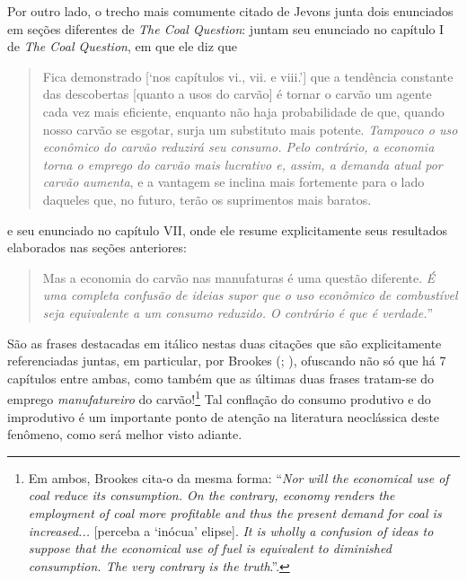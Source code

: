 Por outro lado, o trecho mais comumente citado de Jevons junta dois enunciados em seções diferentes de \textit{The Coal Question}: juntam seu enunciado no capítulo I de \textit{The Coal Question}, em que ele diz que
\begin{quote}
    Fica demonstrado [`nos capítulos vi., vii. e viii.'] que a tendência constante das descobertas [quanto a usos do carvão] é tornar o carvão um agente cada vez mais eficiente, enquanto não haja probabilidade de que, quando nosso carvão se esgotar, surja um substituto mais potente. \textit{Tampouco o uso econômico do carvão reduzirá seu consumo. Pelo contrário, a economia torna o emprego do carvão mais lucrativo e, assim, a demanda atual por carvão aumenta}, e a vantagem se inclina mais fortemente para o lado daqueles que, no futuro, terão os suprimentos mais baratos. \parencite[p. 17, grifo meu]{Jevons1866}
\end{quote}
e seu enunciado no capítulo VII, onde ele resume explicitamente seus resultados elaborados nas seções anteriores:
\begin{quote}
    Mas a economia do carvão nas manufaturas é uma questão diferente. \textit{É uma completa confusão de ideias supor que o uso econômico de combustível seja equivalente a um consumo reduzido. O contrário é que é verdade.}'' \parencite[p. 75, grifo meu]{Jevons1866}
\end{quote}

São as frases destacadas em itálico nestas duas citações que são explicitamente referenciadas juntas, em particular, por Brookes (\citeyear*[p. 319]{Brookes1990}; \citeyear*[p. 357, n. 8]{Brookes2000}), ofuscando não só que há 7 capítulos entre ambas, como também que as últimas duas frases tratam-se do emprego \textit{manufatureiro} do carvão!\footnote{Em ambos, Brookes cita-o da mesma forma: ``\textit{Nor will the economical use of coal reduce its consumption. On the contrary, economy renders the employment of coal more profitable and thus the present demand for coal is increased...} [perceba a `inócua' elipse]. \textit{It is wholly a confusion of ideas to suppose that the economical use of fuel is equivalent to diminished consumption. The very contrary is the truth}.''.} Tal conflação do consumo produtivo e do improdutivo é um importante ponto de atenção na literatura neoclássica deste fenômeno, como será melhor visto adiante.


